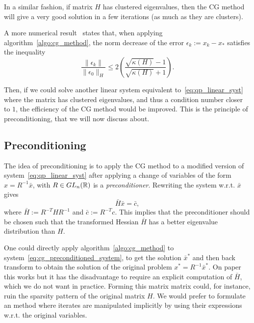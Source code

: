 \documentclass[10pt]{article}
\numberwithin{equation}{section}
\begin{document}
	 In a similar fashion, if matrix $H$ has clustered eigenvalues, then the CG method will give a very good solution in a few iterations (as much as they are clusters). 
	 
	 A more numerical result~\citep[][Theorem 5.1.7]{conn-etal:2000} states that, when applying algorithm~\ref{algo:cg_method}, the norm decrease of the error $\epsilon_k := x_k-x_*$ satisfies the inequality
	 \begin{equation}\label{eq:cg_error_decrease_inequality}
	 	\dfrac{\|\epsilon_k\|}{\|\epsilon_0\|_H} \le 2 \left(\dfrac{\sqrt{\kappa(H)}-1}{\sqrt{\kappa(H)}+1}\right).
	 \end{equation}
	 
	 Then, if we could solve another linear system equivalent to~\eqref{eq:qp_linear_syst}  where the matrix has clustered eigenvalues, and thus a condition number closer to $1$, the efficiency of the CG method would be improved. This is the principle of preconditioning, that we will now discuss about.
	 
	 \subsection{Preconditioning}
	 
	 The idea of preconditioning is to apply the CG method to a modified version of system~\eqref{eq:qp_linear_syst} after applying a change of variables of the form $x=R^{-1}\bar{x}$, with $R \in GL_n({\mathbb{R}})$ is a \textit{preconditioner}. Rewriting the system w.r.t. $\bar{x}$ gives 
	 \begin{equation}\label{eq:cg_preconditioned_system}
	 	\bar{H}\bar{x} = \bar{c},
	 \end{equation}
	 where $\bar{H}:= R^{-T}HR^{-1}$ and $\bar{c}:= R^{-T}c$. This implies that the preconditioner should be chosen such that the transformed Hessian $\bar{H}$ has a better eigenvalue distribution than $H$.
	 
	 One could directly apply algorithm~\ref{algo:cg_method} to system~\eqref{eq:cg_preconditioned_system}, to get the solution $\bar{x}^*$ and then back transform to obtain the solution of the original problem $x^*=R^{-1}\bar{x}^*$. On paper this works but it has the disadvantage to require an explicit computation of $\bar{H}$, which we do not want in practice. Forming this matrix matrix could, for instance, ruin the sparsity pattern of the original matrix $H$. We would prefer to formulate an method where iterates are manipulated implicitly by using their expressions w.r.t. the original variables. 
	 
\end{document}
